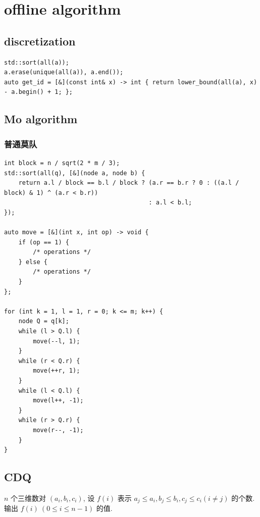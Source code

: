 \documentclass[UTF8, a4paper, titlepage, twoside]{ctexart}
\begin{document}
\newpage
\section{ offline algorithm}
\subsection{ discretization }
\begin{lstlisting}[style=cpp]
std::sort(all(a));
a.erase(unique(all(a)), a.end());
auto get_id = [&](const int& x) -> int { return lower_bound(all(a), x) - a.begin() + 1; };
\end{lstlisting}

\subsection{ Mo algorithm }
\subsubsection*{ 普通莫队 }
\begin{lstlisting}[style=cpp]
int block = n / sqrt(2 * m / 3);
std::sort(all(q), [&](node a, node b) {
    return a.l / block == b.l / block ? (a.r == b.r ? 0 : ((a.l / block) & 1) ^ (a.r < b.r))
                                        : a.l < b.l;
});

auto move = [&](int x, int op) -> void {
    if (op == 1) {
        /* operations */
    } else {
        /* operations */
    }
};

for (int k = 1, l = 1, r = 0; k <= m; k++) {
    node Q = q[k];
    while (l > Q.l) {
        move(--l, 1);
    }
    while (r < Q.r) {
        move(++r, 1);
    }
    while (l < Q.l) {
        move(l++, -1);
    }
    while (r > Q.r) {
        move(r--, -1);
    }
}
\end{lstlisting}

\subsection{ CDQ }

\(n\) 个三维数对 \((a_i, b_i, c_i)\), 设 \(f(i)\) 表示 \(a_j \leqslant a_i, b_j \leqslant b_i, c_j \leqslant c_i (i \neq j)\) 的个数.
输出 \(f(i) \ (0 \leqslant i \leqslant n - 1)\) 的值.
\end{document}
